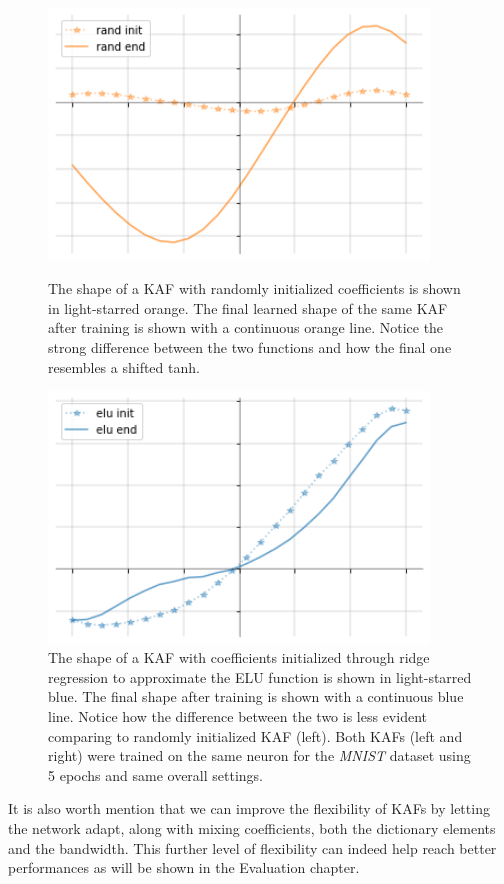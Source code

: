 \documentclass[LaM,binding=0.6cm]{./packages/sapthesis/sapthesis}
\begin{document}
    \begin{figure}
        \centering
        \begin{minipage}{0.45\textwidth}
            \centering
            \includegraphics[width=0.9\textwidth]{randridge.png} %
            \caption{The shape of a KAF with randomly initialized coefficients is shown in light-starred orange. The final learned shape of the same KAF after 
            training is shown with a continuous orange line. Notice the strong difference between the two functions and how the final one resembles a shifted
            tanh.}
            \label{fig:rand}
        \end{minipage}\hfill
        \begin{minipage}{0.45\textwidth}
            \centering
            \includegraphics[width=0.9\textwidth]{eluridge.png} %
            \caption{The shape of a KAF with coefficients initialized through ridge regression to approximate the ELU function is shown in light-starred blue.
            The final shape after training is shown with a continuous blue line. Notice how the difference between the two is less evident comparing to randomly 
            initialized KAF (left). Both KAFs (left and right) were trained on the same neuron for the \textit{MNIST} dataset using 5 epochs and same overall settings.  }
            \label{fig:ridge}
        \end{minipage}
    \end{figure}
    It is also worth mention that we can improve the flexibility of KAFs by letting the network adapt, along with mixing coefficients, both the dictionary elements
    and the bandwidth. This further level of flexibility can indeed help reach better performances as will be shown in the Evaluation chapter.
\end{document}
